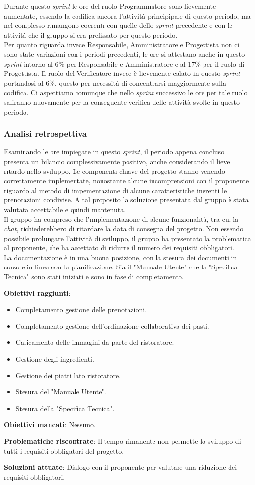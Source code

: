 Durante questo \textit{sprint} le ore del ruolo Programmatore sono lievemente aumentate, essendo la codifica ancora l'attività principipale di questo periodo, ma nel complesso rimangono coerenti con quelle dello \textit{sprint} precedente e con le attività che il gruppo si era prefissato per questo periodo.\\ 
Per quanto riguarda invece Responsabile, Amministratore e Progettista non ci sono state variazioni con i periodi precedenti, le ore si attestano anche in questo \textit{sprint} intorno al 6\% per Responsabile e Amministratore e al 17\% per il ruolo di Progettista. 
Il ruolo del Verificatore invece è lievemente calato in questo \textit{sprint} portandosi al 6\%, questo per necessità di concentrarsi maggiormente sulla codifica. Ci aspettiamo comunque che nello \textit{sprint} successivo le ore per tale ruolo saliranno nuovamente per la conseguente verifica delle attività svolte in questo periodo.


\subsubsection{Analisi retrospettiva}
Esaminando le ore impiegate in questo \textit{sprint}, il periodo appena concluso presenta un bilancio complessivamente positivo, anche considerando il lieve ritardo nello sviluppo.
Le componenti chiave del progetto stanno venendo correttamente implementate, nonostante alcune incomprensioni con il proponente riguardo al metodo di impementazione di alcune caratteristiche inerenti le prenotazioni condivise.
A tal proposito la soluzione presentata dal gruppo è stata valutata accettabile e quindi mantenuta.\\
Il gruppo ha compreso che l'implementazione di alcune funzionalità, tra cui la \textit{chat}, richiederebbero di ritardare la data di consegna del progetto.
Non essendo possibile prolungare l'attività di sviluppo, il gruppo ha presentato la problematica al proponente, che ha accettato di ridurre il numero dei requisiti obbligatori. \\
La documentazione è in una buona posizione, con la stesura dei documenti in corso e in linea con la pianificazione. Sia il "Manuale Utente" che la "Specifica Tecnica" 
sono stati iniziati e sono in fase di completamento.

\textbf{Obiettivi raggiunti}:
\begin{itemize}
	\item Completamento gestione delle prenotazioni.
	\item Completamento gestione dell'ordinazione collaborativa dei pasti.
	\item Caricamento delle immagini da parte del ristoratore.
	\item Gestione degli ingredienti.
	\item Gestione dei piatti lato ristoratore.
	\item Stesura del "Manuale Utente".
	\item Stesura della "Specifica Tecnica".
\end{itemize}


\textbf{Obiettivi mancati}: Nessuno.

\textbf{Problematiche riscontrate}: Il tempo rimanente non permette lo sviluppo di tutti i requisiti obbligatori del progetto.

\textbf{Soluzioni attuate}: Dialogo con il proponente per valutare una riduzione dei requisiti obbligatori.